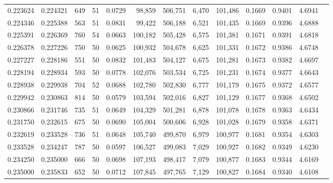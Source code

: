 \begin{tabular}{rrrrrrrrrrrrr}
0.223624 & 0.224321 &   649 &  51 &                                     0.0729 &  98,859 & 506,751 &   6,470 & 101,486 & 0.1669 & 0.9401 & 4.6941 \\
0.224346 & 0.225388 &   563 &  51 &                                     0.0831 &  99,422 & 506,188 &   6,521 & 101,435 & 0.1669 & 0.9396 & 4.6888 \\
0.225391 & 0.226369 &   760 &  54 &                                     0.0663 & 100,182 & 505,428 &   6,575 & 101,381 & 0.1671 & 0.9391 & 4.6818 \\
0.226378 & 0.227226 &   750 &  50 &                                     0.0625 & 100,932 & 504,678 &   6,625 & 101,331 & 0.1672 & 0.9386 & 4.6748 \\
0.227227 & 0.228186 &   551 &  50 &                                     0.0832 & 101,483 & 504,127 &   6,675 & 101,281 & 0.1673 & 0.9382 & 4.6697 \\
0.228194 & 0.228934 &   593 &  50 &                                     0.0778 & 102,076 & 503,534 &   6,725 & 101,231 & 0.1674 & 0.9377 & 4.6643 \\
0.228938 & 0.229938 &   704 &  52 &                                     0.0688 & 102,780 & 502,830 &   6,777 & 101,179 & 0.1675 & 0.9372 & 4.6577 \\
0.229942 & 0.230863 &   814 &  50 &                                     0.0579 & 103,594 & 502,016 &   6,827 & 101,129 & 0.1677 & 0.9368 & 4.6502 \\
0.230866 & 0.231746 &   735 &  51 &                                     0.0649 & 104,329 & 501,281 &   6,878 & 101,078 & 0.1678 & 0.9363 & 4.6434 \\
0.231750 & 0.232615 &   675 &  50 &                                     0.0690 & 105,004 & 500,606 &   6,928 & 101,028 & 0.1679 & 0.9358 & 4.6371 \\
0.232619 & 0.233528 &   736 &  51 &                                     0.0648 & 105,740 & 499,870 &   6,979 & 100,977 & 0.1681 & 0.9354 & 4.6303 \\
0.233528 & 0.234247 &   787 &  50 &                                     0.0597 & 106,527 & 499,083 &   7,029 & 100,927 & 0.1682 & 0.9349 & 4.6230 \\
0.234250 & 0.235000 &   666 &  50 &                                     0.0698 & 107,193 & 498,417 &   7,079 & 100,877 & 0.1683 & 0.9344 & 4.6169 \\
0.235000 & 0.235833 &   652 &  50 &                                     0.0712 & 107,845 & 497,765 &   7,129 & 100,827 & 0.1684 & 0.9340 & 4.6108 \\

\end{tabular}
